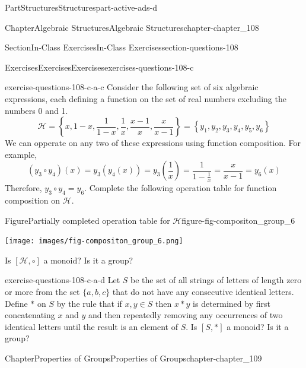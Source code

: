 \documentclass[oneside,10pt,]{book}
\numberwithin{equation}{section}
\begin{document}
\begin{partptx}{Part}{Structures}{}{Structures}{}{}{part-active-ads-d}
\begin{chapterptx}{Chapter}{Algebraic Structures}{}{Algebraic Structures}{}{}{chapter-chapter_108}
\begin{sectionptx}{Section}{In-Class Exercises}{}{In-Class Exercises}{}{}{section-questions-108}
\begin{exercises-subsection-numberless}{Exercises}{Exercises}{}{Exercises}{}{}{exercises-questions-108-c}
\begin{exercisegroup}
\begin{divisionexerciseeg}{3}{}{}{exercise-questions-108-c-a-c}%
Consider the following set of six  algebraic expressions, each defining a function on the set of real numbers excluding the numbers 0 and 1.%
\begin{equation*}
\mathcal{H}=\left\{x,1-x,\frac{1}{1-x},\frac{1}{x},\frac{x-1}{x},\frac{x}{x-1}\right\}
=\left\{y_1,y_2,y_3,y_4,y_5,y_6\right\}
\end{equation*}
We can opperate on any two of these expressions using function composition.  For example,%
\begin{equation*}
(y_3 \circ y_4)(x) = y_3(y_4(x))=y_3(\frac{1}{x})=\frac{1}{1-\frac{1}{x}}=\frac{x}{x-1}=y_6(x)
\end{equation*}
Therefore, \(y_3 \circ y_4 = y_6\).  Complete the following operation table for function composition on \(\mathcal{H}\).%
\begin{figureptx}{Figure}{Partially completed operation table for \(\mathcal{H}\)}{figure-fig-compositon_group_6}{}%
\begin{image}{0.15}{0.7}{0.15}{}%
\texttt{[image: images/fig-compositon\_group\_6.png]}
\end{image}%
\tcblower
\end{figureptx}%
Is \([\mathcal{H},\circ]\) a monoid? Is it a group?%
\end{divisionexerciseeg}%
\begin{divisionexerciseeg}{4}{}{}{exercise-questions-108-c-a-d}%
Let \(S\) be the set of all strings of letters of length zero or more from the set \(\{a,b,c\}\) that do not have any consecutive identical letters.  Define \(*\) on \(S\) by the rule that if \(x, y \in S\) then \(x*y\) is determined by first concatenating  \(x\) and \(y\) and then repeatedly removing any occurrences of two identical letters until the result is an element of \(S\).   Is \([S,*]\) a monoid?  Is it a group?%
\end{divisionexerciseeg}%
\end{exercisegroup}
\par\medskip\noindent
\end{exercises-subsection-numberless}
\end{sectionptx}
\end{chapterptx}
%
\typeout{************************************************}
\typeout{************************************************}
%
\begin{chapterptx}{Chapter}{Properties of Groups}{}{Properties of Groups}{}{}{chapter-chapter_109}

\end{chapterptx}
\end{partptx}
\end{document}
